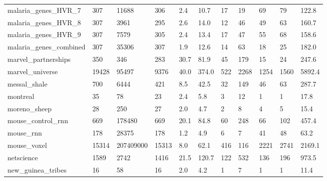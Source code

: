 \begin{longtable}{lllllllllll}
 malaria\_genes\_HVR\_7                                & 307        & 11688     & 306   & 2.4    & 10.7   & 17    & 19     & 69     & 79     & 122.8   \\
 malaria\_genes\_HVR\_8                                & 307        & 3961      & 295   & 2.6    & 14.0   & 12    & 46     & 49     & 63     & 160.7   \\
 malaria\_genes\_HVR\_9                                & 307        & 7579      & 305   & 2.4    & 13.4   & 17    & 47     & 55     & 68     & 158.6   \\
 malaria\_genes\_combined                             & 307        & 35306     & 307   & 1.9    & 12.6   & 14    & 63     & 18     & 25     & 182.0   \\
 marvel\_partnerships                                & 350        & 346       & 283   & 30.7   & 81.9   & 45    & 179    & 15     & 24     & 247.6   \\
 marvel\_universe                                    & 19428      & 95497     & 9376  & 40.0   & 374.0  & 522   & 2268   & 1254   & 1560   & 5892.4  \\
 messal\_shale                                       & 700        & 6444      & 421   & 8.5    & 42.5   & 32    & 149    & 46     & 63     & 287.7   \\
 montreal                                           & 35         & 78        & 23    & 2.4    & 5.8    & 3     & 12     & 1      & 1      & 17.8    \\
 moreno\_sheep                                       & 28         & 250       & 27    & 2.0    & 4.7    & 2     & 8      & 4      & 5      & 15.4    \\
 mouse\_control\_rnn                                  & 669        & 178480    & 669   & 20.1   & 84.8   & 60    & 248    & 66     & 102    & 457.4   \\
 mouse\_rnn                                          & 178        & 28375     & 178   & 1.2    & 4.9    & 6     & 7      & 41     & 48     & 63.2    \\
 mouse\_voxel                                        & 15314      & 207409000 & 15313 & 8.0    & 62.1   & 416   & 116    & 2221   & 2741   & 2169.1  \\
 netscience                                         & 1589       & 2742      & 1416  & 21.5   & 120.7  & 122   & 532    & 136    & 196    & 973.5   \\
 new\_guinea\_tribes                                  & 16         & 58        & 16    & 2.0    & 4.2    & 1     & 7      & 1      & 1      & 11.4    \\

\end{longtable}
